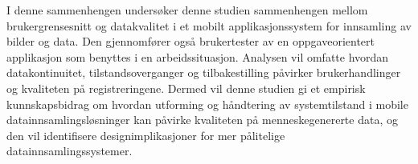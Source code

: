 I denne sammenhengen undersøker denne studien sammenhengen mellom brukergrensesnitt og datakvalitet i et mobilt applikasjonssystem for innsamling av bilder og data. Den gjennomfører også brukertester av en oppgaveorientert applikasjon som benyttes i en arbeidssituasjon. Analysen vil omfatte hvordan datakontinuitet, tilstandsoverganger og tilbakestilling påvirker brukerhandlinger og kvaliteten på registreringene.
Dermed vil denne studien gi et empirisk kunnskapsbidrag om hvordan utforming og håndtering av systemtilstand i mobile datainnsamlingsløsninger kan påvirke kvaliteten på menneskegenererte data, og den vil identifisere designimplikasjoner for mer pålitelige datainnsamlingssystemer.